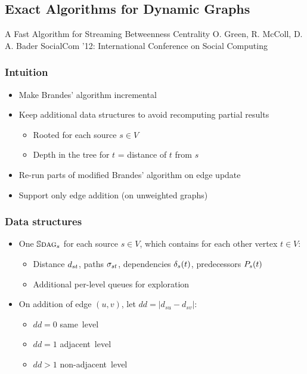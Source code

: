 \subsection{Exact Algorithms for Dynamic Graphs}

\begin{frame}
  \centering
  \vfill
  {\huge A Fast Algorithm for Streaming Betweenness Centrality}
  \vfill
  {\Large O. Green, R. McColl, D. A. Bader}
  \vfill
  {\large SocialCom '12: International Conference on Social Computing}
  \vfill
\end{frame}


\begin{frame}
  \frametitle{Intuition}

  \begin{itemize}
    \item Make Brandes' algorithm incremental
    \item Keep additional data structures to avoid recomputing partial results
      \begin{itemize}
        \item Rooted \spdag for each source $s \in V$
        \item Depth in the tree for $t$ = distance of $t$ from $s$
      \end{itemize}
    \item Re-run parts of modified Brandes' algorithm on edge update
    \item Support only edge addition (on unweighted graphs)
  \end{itemize}

\end{frame}


\begin{frame}
  \frametitle{Data structures}

  \begin{itemize}
    \item One $\mathbb{S}\textsc{dag}_s$ for each source $s \in V$, which contains for each other vertex $t \in V$:
      \begin{itemize}
        \item Distance $d_{st}$, paths $\sigma_{st}$, dependencies $\delta_{s}(t)$, predecessors $P_{s}(t)$
        \item Additional per-level queues for exploration
      \end{itemize}
  \end{itemize}
  \begin{itemize}
    \item On addition of edge $(u,v)$, let $dd = |d_{su} - d_{sv}|$:
      \begin{itemize}
        \item $dd = 0$ same~level
        \item $dd = 1$ adjacent~level
        \item $dd > 1$ non-adjacent~level
      \end{itemize}
  \end{itemize}

\end{frame}


